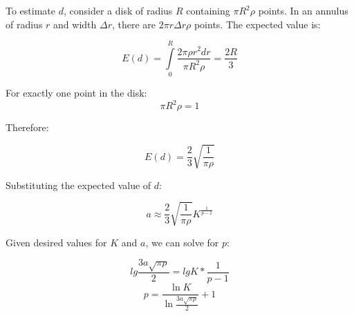 To estimate $d$, consider a disk of radius $R$ containing $\pi R^2 \rho$ points. In an annulus of radius $r$ and width $\Delta r$, there are $2\pi r \Delta r \rho$ points. The expected value is:

\begin{equation}
E(d) = \int\limits_0^R \frac{2\pi \rho r^2 dr}{\pi R^2 \rho} = \frac{2R}{3}
\end{equation}

For exactly one point in the disk:
\begin{equation}
\pi R^2 \rho = 1
\end{equation}

Therefore:

\begin{equation}
E(d) = \frac{2}{3}\sqrt{\frac{1}{\pi \rho}}
\end{equation}

Substituting the expected value of $d$:

\begin{equation}
a \approx \frac{2}{3}\sqrt{\frac{1}{\pi \rho}}K^{\frac{1}{p-1}}
\end{equation}

Given desired values for $K$ and $a$, we can solve for $p$:

\begin{equation}
lg\frac{3a\sqrt{{\pi \rho}}}{2}=lgK*{\frac{1}{p-1}}
\end{equation}
\begin{equation}
p= \frac{\ln K}{\ln\frac{3a\sqrt{{\pi \rho}}}{2}}+1
\end{equation}